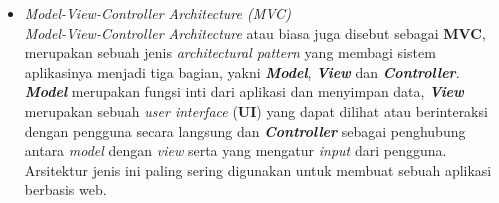 \documentclass[a4paper]{article}
\begin{document}
\begin{itemize}
    \item \textit{Model-View-Controller Architecture (MVC)}\\
          \textit{Model-View-Controller Architecture} atau biasa juga disebut sebagai \textbf{MVC}, merupakan sebuah jenis \textit{architectural pattern} yang membagi sistem aplikasinya menjadi tiga bagian, yakni \textbf{\textit{Model}}, \textbf{\textit{View}} dan \textbf{\textit{Controller}}. \textbf{\textit{Model}} merupakan fungsi inti dari aplikasi dan menyimpan data, \textbf{\textit{View}} merupakan sebuah \textit{user interface} (\textbf{UI}) yang dapat dilihat atau berinteraksi dengan pengguna secara langsung dan \textbf{\textit{Controller}} sebagai penghubung antara \textit{model} dengan \textit{view} serta yang mengatur \textit{input} dari pengguna. Arsitektur jenis ini paling sering digunakan untuk membuat sebuah aplikasi berbasis web\autocite{archi-pattern}.
\end{itemize}
\end{document}

